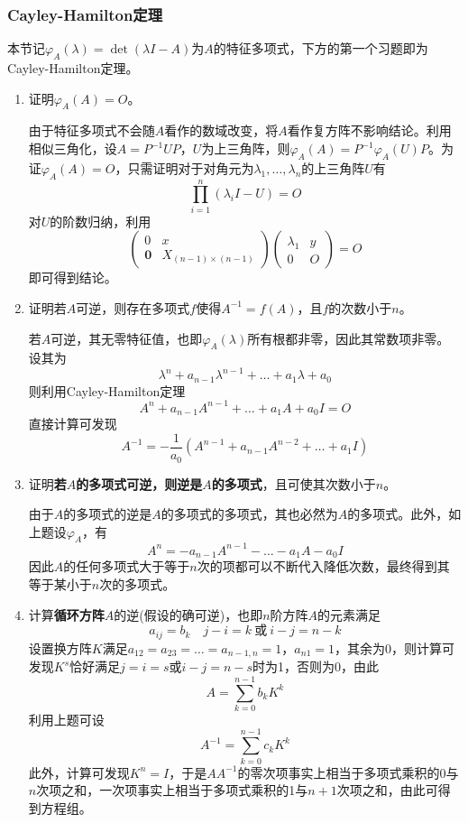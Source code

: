 \documentclass[a4paper,UTF8,fontset=windows]{ctexart}
\begin{document}
\subsubsection{Cayley-Hamilton定理}
本节记$\varphi_A(\lambda)=\det(\lambda I-A)$为$A$的特征多项式，下方的第一个习题即为Cayley-Hamilton定理。
\begin{enumerate}
    \item 证明$\varphi_A(A)=O$。
    
    由于特征多项式不会随$A$看作的数域改变，将$A$看作复方阵不影响结论。利用相似三角化，设$A=P^{-1}UP$，$U$为上三角阵，则$\varphi_A(A)=P^{-1}\varphi_A(U)P$。为证$\varphi_A(A)=O$，只需证明对于对角元为$\lambda_1,\dots,\lambda_n$的上三角阵$U$有
    $$\prod_{i=1}^n(\lambda_iI-U)=O$$
    对$U$的阶数归纳，利用
    $$\begin{pmatrix}0&x\\\mathbf{0}&X_{(n-1)\times(n-1)}\end{pmatrix}\begin{pmatrix}\lambda_1&y\\0&O\end{pmatrix}=O$$
    即可得到结论。
    
    \item 证明若$A$可逆，则存在多项式$f$使得$A^{-1}=f(A)$，且$f$的次数小于$n$。
    
    若$A$可逆，其无零特征值，也即$\varphi_A(\lambda)$所有根都非零，因此其常数项非零。设其为
    $$\lambda^n+a_{n-1}\lambda^{n-1}+\dots+a_1\lambda+a_0$$
    则利用Cayley-Hamilton定理
    $$A^n+a_{n-1}A^{n-1}+\dots+a_1A+a_0I=O$$
    直接计算可发现
    $$A^{-1}=-\frac{1}{a_0}(A^{n-1}+a_{n-1}A^{n-2}+\dots+a_1I)$$
    
    \item 证明\textbf{若$A$的多项式可逆，则逆是$A$的多项式}，且可使其次数小于$n$。
    
    由于$A$的多项式的逆是$A$的多项式的多项式，其也必然为$A$的多项式。此外，如上题设$\varphi_A$，有
    $$A^n=-a_{n-1}A^{n-1}-\dots-a_1A-a_0I$$
    因此$A$的任何多项式大于等于$n$次的项都可以不断代入降低次数，最终得到其等于某小于$n$次的多项式。
    
    \item 计算\textbf{循环方阵}$A$的逆(假设的确可逆)，也即$n$阶方阵$A$的元素满足
    $$a_{ij}=b_k\quad j-i=k\ \text{或}\ i-j=n-k$$
    设置换方阵$K$满足$a_{12}=a_{23}=\dots=a_{n-1,n}=1$，$a_{n1}=1$，其余为0，则计算可发现$K^s$恰好满足$j=i=s$或$i-j=n-s$时为1，否则为0，由此
    $$A=\sum_{k=0}^{n-1}b_kK^k$$
    利用上题可设
    $$A^{-1}=\sum_{k=0}^{n-1}c_kK^k$$
    此外，计算可发现$K^n=I$，于是$AA^{-1}$的零次项事实上相当于多项式乘积的0与$n$次项之和，一次项事实上相当于多项式乘积的1与$n+1$次项之和，由此可得到方程组。


\end{enumerate}
\end{document}
